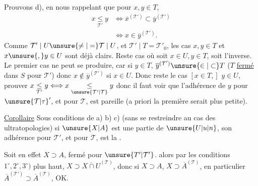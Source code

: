 Prouvons d), en nous rappelant que pour $x,y\in T$,
\[
\begin{aligned}
x\underset{\mathcal{T}'}{\leq}y&\Longleftrightarrow\overline{x}^{(\mathcal{T}')}\subset\overline{y}^{(\mathcal{T}')}\\
&\Longleftrightarrow x\in\overline{y}^{(\mathcal{T}')}.
\end{aligned}
\]
Comme $\mathcal{T}'\mid U\unsure{\ne|=}\mathcal{T}\mid U$, et $\mathcal{T}'\mid T=\mathcal{T}'_0$, les cas $x,y\in T$ et $x\unsure{,}y\in U$ sont déjà clairs. Reste  cas où soit $x\in U,y\in T$, soit l'inverse. Le premier cas ne peut se produire, car si $y\in T$, $\overline{y}^{(\mathcal{T}')}\unsure{\in|\subset}T$ ($T$ \uline{fermé} dans $S$ pour $\mathcal{T}'$) donc $x\notin\overline{y}^{(\mathcal{T}')}$  si $x\in U$. Donc reste le cas $[x\in T,]$ $y\in U$, prouver $x\underset{\mathcal{T}'}{\leq}y\Longleftrightarrow x\underset{\unsure{\mathcal{T}'|\mathcal{T}}}{\leq}y$
donc il faut voir que l'adhérence de $y$ pour ${\unsure{\mathcal{T}|\tau}}'$, et pour $\mathcal{T}$, est pareille (a priori la première serait plus petite).  

\uline{Corollaire} Sous   conditions de a) b) c) (sans se restreindre au cas des ultratopologies) si $\unsure{X|A}$ est une partie de $\unsure{U|u|n}$, son adhérence pour $\mathcal{T}'$, et pour $\mathcal{T}$, est la \unsure{$=$}. 

Soit en effet $X\supset A$, fermé pour $\unsure{T'|\mathcal{T}'}$. alors par les conditions $1^\circ,2^\circ,3^\circ)$ plus haut, $X\supset\overline{X\cap U}^{(\mathcal{T})}$, donc si $X\supset A$, $X\supset\overline{A}^{(\mathcal{T})}$,  en particulier $\overline{A}^{(\mathcal{T}')}\supset\overline{A}^{(\mathcal{T})}$, OK.


